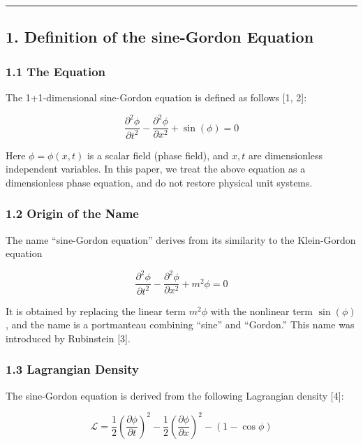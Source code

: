 \documentclass[a4paper,11pt]{article}
\begin{document}
\begin{center}\rule{0.5\linewidth}{0.5pt}\end{center}

\subsection{1. Definition of the sine-Gordon
Equation}\label{definition-of-the-sine-gordon-equation}

\subsubsection{1.1 The Equation}\label{the-equation}

The 1+1-dimensional sine-Gordon equation is defined as follows {[}1,
2{]}:

\[\frac{\partial^2 \phi}{\partial t^2} - \frac{\partial^2 \phi}{\partial x^2} + \sin(\phi) = 0\]

Here \(\phi = \phi(x, t)\) is a scalar field (phase field), and \(x, t\)
are dimensionless independent variables. In this paper, we treat the
above equation as a dimensionless phase equation, and do not restore
physical unit systems.

\subsubsection{1.2 Origin of the Name}\label{origin-of-the-name}

The name ``sine-Gordon equation'' derives from its similarity to the
Klein-Gordon equation

\[\frac{\partial^2 \phi}{\partial t^2} - \frac{\partial^2 \phi}{\partial x^2} + m^2 \phi = 0\]

It is obtained by replacing the linear term \(m^2 \phi\) with the
nonlinear term \(\sin(\phi)\), and the name is a portmanteau combining
``sine'' and ``Gordon.'' This name was introduced by Rubinstein {[}3{]}.

\subsubsection{1.3 Lagrangian Density}\label{lagrangian-density}

The sine-Gordon equation is derived from the following Lagrangian
density {[}4{]}:

\[\mathcal{L} = \frac{1}{2}\left(\frac{\partial \phi}{\partial t}\right)^2 - \frac{1}{2}\left(\frac{\partial \phi}{\partial x}\right)^2 - (1 - \cos\phi)\]
\end{document}

